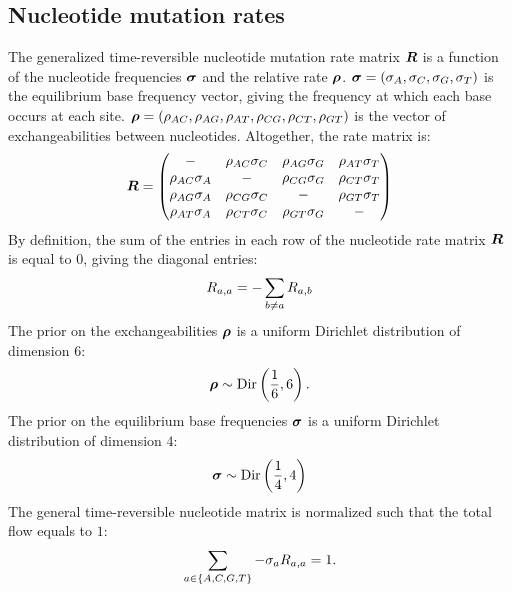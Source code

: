 \subsection{Nucleotide mutation rates}
The generalized time-reversible nucleotide mutation rate matrix $\bm{R}$ is a function of the nucleotide frequencies $\bm{\sigma}$ and the relative rate $\bm{\rho}$.
$\bm{\sigma} = (\sigma_A , \sigma_C , \sigma_G , \sigma_T)$ is the equilibrium base frequency vector, giving the frequency at which each base occurs at each site.
$\bm{\rho} = \left( \rho_{AC}, \rho_{AG}, \rho_{AT}, \rho_{CG}, \rho_{CT}, \rho_{GT}\right)$ is the vector of exchangeabilities between nucleotides.
Altogether, the rate matrix is:
\begin{equation}
    \label{eq:gtr-mutrates}
    \Mutmatrix =
    \begin{pmatrix}
        - & {\exchan_{AC}\mutequi_C} & {\exchan_{AG}\mutequi_G} & {\exchan_{AT}\mutequi_T} \\
        {\exchan_{AC}\mutequi_A} &                        - & {\exchan_{CG}\mutequi_G} & {\exchan_{CT}\mutequi_T} \\
        {\exchan_{AG}\mutequi_A} & {\exchan_{CG}\mutequi_C} &                        - & {\exchan_{GT}\mutequi_T} \\
        {\exchan_{AT}\mutequi_A} & {\exchan_{CT}\mutequi_C} & {\exchan_{GT}\mutequi_G} & -
    \end{pmatrix}
\end{equation}
By definition, the sum of the entries in each row of the nucleotide rate matrix $\bm{R}$ is equal to $0$, giving the diagonal entries:
\begin{equation}
    R_{a,a} = - \sum\limits_{ b \neq a} R_{a,b}
\end{equation}
The prior on the exchangeabilities $\bm{\rho}$ is a uniform Dirichlet distribution of dimension $6$:
\begin{equation}
    \label{eq:DistribExchan}
    \Exchan \sim \mathrm{Dir}\left( \dfrac{1}{6} , 6\right).
\end{equation}
The prior on the equilibrium base frequencies $\bm{\sigma}$ is a uniform Dirichlet distribution of dimension $4$:
\begin{equation}
    \label{eq:DistribMutequi}
    \Mutequi \sim \mathrm{Dir}\left( \dfrac{1}{4} , 4\right)
\end{equation}
The general time-reversible nucleotide matrix is normalized such that the total flow equals to $1$:
\begin{equation}
    \sum\limits_{a \in \{A, C, G, T\}} - \sigma_a R_{a,a} = 1.
\end{equation}

